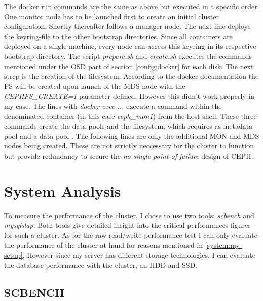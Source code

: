 \documentclass[titlepage, a4paper, 11pt]{scrartcl}
\begin{document}
                The docker run commands are the same as above but executed in a specific order. One monitor node has to be launched first to create an initial cluster configuration.
                Shortly thereafter follows a manager node. The next line deploys the keyring-file to the other bootstrap directories. Since all containers are deployed on a single machine, every node can access this keyring in its respective bootstrap directory. The script \textit{prepare.sh} and \textit{create.sh} executes the commands mentioned under the OSD part of section \ref*{config:docker} for each disk.
                The next strep is the creation of the filesystem. According to the docker documentation the FS will be created upon launch of the MDS node with the \textit{CEPHFS\_CREATE=1} parameter defined. However this didn't work properly in my case. The lines with \textit{docker exec ...} execute a command within the denominated container (in this case 
                \textit{ceph\_mon1}) from the host shell. These three commands create the data pools and the filesystem, which requires as metadata pool and a data pool \cite{CreateaCephfilesystem}.
                The following lines are only the additional MON and MDS nodes being created. These are not strictly neccessary for the cluster to function but provide redundancy to secure the \textit{no single point of failure} design of CEPH.

    \section{System Analysis}

        To measure the performance of the cluster, I chose to use two tools: \textit{scbench} and \textit{mysqlslap}. Both tools give detailed insight into
        the critical performances figures for such a cluster. As for the raw read/write performance test I can only evaluate the performance of the cluster at hand for reasons mentioned 
        in \ref*{system:my-setup}. However since my server has different storage technologies, I can evaluate the database performance with the cluster, an HDD and SSD.

        \subsection{SCBENCH} 

        
\end{document}
